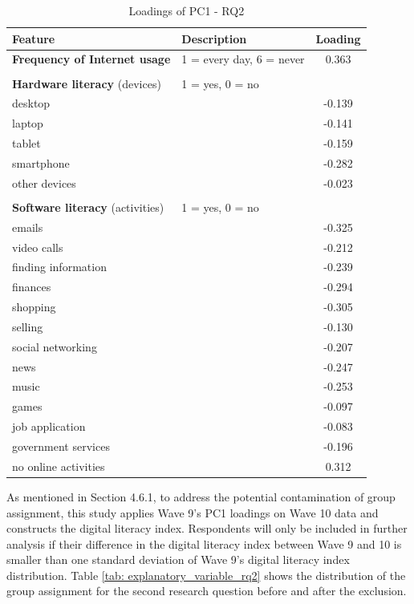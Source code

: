 \begin{table}[h!]
    \centering
    \caption{Loadings of PC1 - RQ2}
    \label{tab:pc1_loadings_rq2}
    \begin{tabular}{llc}
        \toprule
        Feature & Description & Loading \\
        \midrule
        \textbf{Frequency of Internet usage} & 1 = every day, 6 = never & 0.363 \\
        & & \\
        \textbf{Hardware literacy} (devices) & 1 = yes, 0 = no & \\
        desktop &  & -0.139 \\
        laptop &  & -0.141 \\
        tablet &  & -0.159 \\
        smartphone &  & -0.282 \\
        other devices &  & -0.023 \\
        & & \\
        \textbf{Software literacy} (activities) & 1 = yes, 0 = no & \\
        emails &  & -0.325 \\
        video calls &  & -0.212 \\
        finding information &  & -0.239 \\
        finances &  & -0.294 \\
        shopping &  & -0.305 \\
        selling &  & -0.130 \\
        social networking &  & -0.207 \\
        news &  & -0.247 \\
        music &  & -0.253 \\
        games &  & -0.097 \\
        job application &  & -0.083 \\
        government services &  & -0.196 \\
        no online activities &  & 0.312 \\
        \bottomrule
    \end{tabular}
\end{table}

As mentioned in Section 4.6.1, to address the potential contamination of group assignment, this study applies Wave 9's PC1 loadings on Wave 10 data and constructs the digital literacy index. Respondents will only be included in further analysis if their difference in the digital literacy index between Wave 9 and 10 is smaller than one standard deviation of Wave 9's digital literacy index distribution. Table \ref{tab: explanatory_variable_rq2} shows the distribution of the group assignment for the second research question before and after the exclusion.

